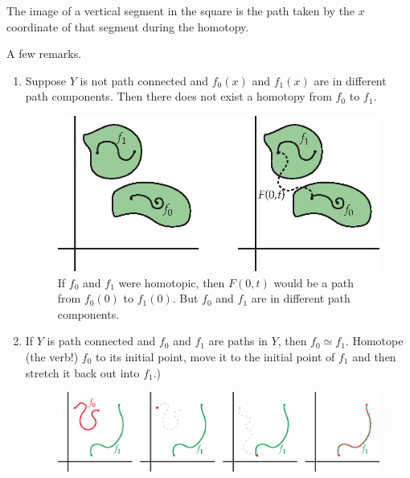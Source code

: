 The image of a vertical segment in the square is the path taken by the $x$ coordinate of that segment during the homotopy.

A few remarks. 
\begin{enumerate}
	\item Suppose $Y$ is not path connected and $f_0(x)$ and $f_1(x)$ are in different path components. Then there does not exist a homotopy from $f_0$ to $f_1$.
	\begin{figure}[ht!]
	    \centering
	    \includegraphics[width=300pt]{images/homotopy/not_path_connected}
	    \caption{If $f_0$ and $f_1$ were homotopic, then $F(0,t)$ would be a path from $f_0(0)$ to $f_1(0)$.  But $f_0$ and $f_1$ are in different path components.}
    \end{figure}
	\item If $Y$ is path connected and $f_0$ and $f_1$ are paths in $Y$, then $f_0 \simeq f_1$. Homotope (the verb!) $f_0$ to its initial point, move it to the initial point of $f_1$ and then stretch it back out into $f_1$.) 
	\begin{figure}[ht!]
	    \centering
	    \includegraphics[width=450pt]{images/homotopy/paths_are_homotopic}
    \end{figure}
\end{enumerate}
